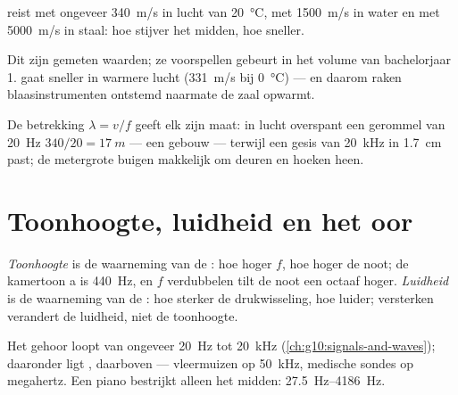 \begin{proposition}[Geluidssnelheid]\label{prop:g12:sound-acoustics:speed}
%
 reist met ongeveer \qty{340}{m/s} in lucht van
\qty{20}{\degreeCelsius}, met \qty{1500}{m/s} in water en met
\qty{5000}{m/s} in staal: hoe stijver het midden, hoe sneller.
\admitted
\end{proposition}

\begin{remark}\label{rem:g12:sound-acoustics:temperature}
Dit zijn gemeten waarden; ze voorspellen gebeurt in het volume van
bachelorjaar 1.  gaat sneller in warmere lucht (\qty{331}{m/s} bij
\qty{0}{\degreeCelsius}) --- en daarom raken blaasinstrumenten ontstemd
naarmate de zaal opwarmt.
\end{remark}

\begin{example}\label{ex:g12:sound-acoustics:wavelengths}
De betrekking $\lambda = v/f$ geeft elk  zijn maat: in lucht
overspant een gerommel van \qty{20}{Hz} $340/20 = \qty{17}{m}$ --- een
gebouw --- terwijl een gesis van \qty{20}{kHz} in \qty{1.7}{cm} past; de
metergrote buigen makkelijk om deuren en hoeken heen.
\end{example}

\section{Toonhoogte, luidheid en het oor}

\begin{definition}\label{def:g12:sound-acoustics:pitch-loudness}
\emph{Toonhoogte} is de waarneming van de :
hoe hoger $f$, hoe hoger de noot; de kamertoon a is \qty{440}{Hz}, en $f$
verdubbelen tilt de noot een octaaf hoger.
\emph{Luidheid} is de waarneming van de : hoe
sterker de drukwisseling, hoe luider; versterken verandert de luidheid,
niet de toonhoogte.
\end{definition}

\begin{remark}\label{rem:g12:sound-acoustics:audible}
Het gehoor loopt van ongeveer \qty{20}{Hz} tot \qty{20}{kHz}
(\cref{ch:g10:signals-and-waves}); daaronder ligt ,
daarboven  --- vleermuizen op \qty{50}{kHz}, medische sondes op
megahertz. Een piano bestrijkt alleen het midden:
\qtyrange{27.5}{4186}{Hz}.
\end{remark}

